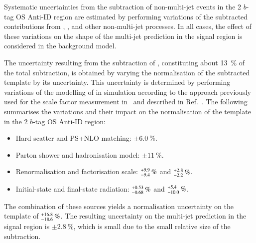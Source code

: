 Systematic uncertainties from the subtraction of non-multi-jet events
in the 2 $b$-tag OS Anti-ID region are estimated by performing
variations of the subtracted contributions from \ttbarTrue,
\ttbarFakes, and other non-multi-jet processes. In all cases, the
effect of these variations on the shape of the multi-jet prediction in
the signal region is considered in the background model.

The uncertainty resulting from the subtraction of \ttbarTrue,
constituting about \SI{13}{\percent} of the total subtraction, is
obtained by varying the normalisation of the subtracted \ttbarTrue
template by its uncertainty. This uncertainty is determined by
performing variations of the modelling of \ttbar in simulation
according to the approach previously used for the \ttbarFakes scale
factor measurement in~ and described
in Ref.~\cite{ATL-PHYS-PUB-2020-023}. The following summarises the
variations and their impact on the normalisation of the \ttbarTrue
template in the 2 $b$-tag OS Anti-ID region:
\begin{itemize}
\item Hard scatter and PS+NLO matching: $\pm\SI{6.0}{\percent}$.
\item Parton shower and hadronisation model: $\pm\SI{11}{\percent}$.
\item Renormalisation and factorisation scale:
  $\numpmerr{+9.9}{-9.4}\valuesep{\si{\percent}}$ and
  $\numpmerr{+2.8}{-2.2}\valuesep{\si{\percent}}$.

\item Initial-state and final-state radiation:
  $\numpmerr{+0.53}{-0.68}\valuesep{\si{\percent}}$ and
  $\numpmerr{+5.4}{-10.0}\valuesep{\si{\percent}}$.
\end{itemize}
The combination of these sources yields a normalisation uncertainty on
the \ttbarTrue template of
$\numpmerr{+16.8}{-18.6}\valuesep{\si{\percent}}$. The resulting
uncertainty on the multi-jet prediction in the signal region is
$\pm \SI{2.8}{\percent}$, which is small due to the small relative
size of the \ttbarTrue subtraction.

